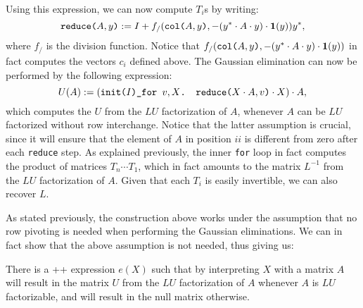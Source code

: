 Using this expression, we can now compute $T_i$s by writing:
$$\texttt{reduce(}A,y\texttt{)} := I + f_/(\texttt{col(}A,y\texttt{)},-(y^*\cdot A\cdot y)\cdot \mathbf{1}(y))y^*,$$
where $f_/$ is the division function. Notice that $f_/(\texttt{col(}A,y\texttt{)},-(y^*\cdot A\cdot y)\cdot \mathbf{1}(y))$ in fact computes the vectors $c_i$ defined above. The Gaussian elimination can now be performed by the following expression:
$$
U(A) :=  \left( \texttt{init(}I\texttt{)\_}\texttt{for }v,X \texttt{. }\texttt{reduce(}X\cdot A,v\texttt{)}\cdot X \right) \cdot A,
$$
which computes the $U$ from the $LU$ factorization of $A$, whenever $A$ can be $LU$ factorized without row interchange. Notice that the latter assumption is crucial, since it will ensure that the element of $A$ in position $ii$ is different from zero after each \texttt{reduce} step. As explained previously, the inner \texttt{for} loop in fact computes the product of matrices $T_{n}\cdots T_1$, which in fact amounts to the matrix $L^{-1}$ from the $LU$ factorization of $A$. Given that each $T_i$ is easily invertible, we can also recover $L$.

As stated previously, the construction above works under the assumption that no row pivoting is needed when performing the Gaussian eliminations. We can in fact show that the above assumption is not needed, thus giving us:
\begin{proposition}\label{prop:gauss}
There is a \lang++ expression $e(X)$ such that by interpreting $X$ with a matrix $A$ will result in the matrix $U$ from the $LU$ factorization of $A$ whenever $A$ is $LU$ factorizable, and will result in the null matrix otherwise.
\end{proposition}

